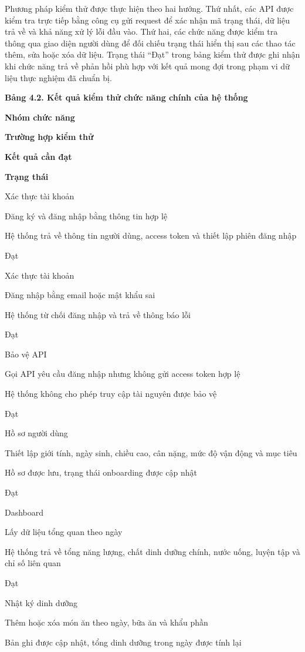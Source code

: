 Phương pháp kiểm thử được thực hiện theo hai hướng. Thứ nhất, các API được kiểm tra trực tiếp bằng công cụ gửi request để xác nhận mã trạng thái, dữ liệu trả về và khả năng xử lý lỗi đầu vào. Thứ hai, các chức năng được kiểm tra thông qua giao diện người dùng để đối chiếu trạng thái hiển thị sau các thao tác thêm, sửa hoặc xóa dữ liệu. Trạng thái “Đạt” trong bảng kiểm thử được ghi nhận khi chức năng trả về phản hồi phù hợp với kết quả mong đợi trong phạm vi dữ liệu thực nghiệm đã chuẩn bị.

\textbf{Bảng 4.2. Kết quả kiểm thử chức năng chính của hệ thống}

\textbf{Nhóm chức năng}

\textbf{Trường hợp kiểm thử}

\textbf{Kết quả cần đạt}

\textbf{Trạng thái}

Xác thực tài khoản

Đăng ký và đăng nhập bằng thông tin hợp lệ

Hệ thống trả về thông tin người dùng, access token và thiết lập phiên đăng nhập

Đạt

Xác thực tài khoản

Đăng nhập bằng email hoặc mật khẩu sai

Hệ thống từ chối đăng nhập và trả về thông báo lỗi

Đạt

Bảo vệ API

Gọi API yêu cầu đăng nhập nhưng không gửi access token hợp lệ

Hệ thống không cho phép truy cập tài nguyên được bảo vệ

Đạt

Hồ sơ người dùng

Thiết lập giới tính, ngày sinh, chiều cao, cân nặng, mức độ vận động và mục tiêu

Hồ sơ được lưu, trạng thái onboarding được cập nhật

Đạt

Dashboard

Lấy dữ liệu tổng quan theo ngày

Hệ thống trả về tổng năng lượng, chất dinh dưỡng chính, nước uống, luyện tập và chỉ số liên quan

Đạt

Nhật ký dinh dưỡng

Thêm hoặc xóa món ăn theo ngày, bữa ăn và khẩu phần

Bản ghi được cập nhật, tổng dinh dưỡng trong ngày được tính lại

